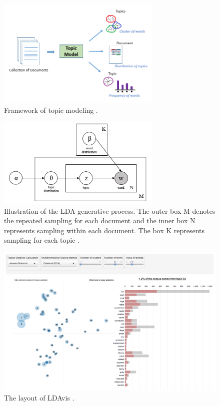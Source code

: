 \documentclass{article}
\begin{document}
\begin{figure}
\centering
\includegraphics[width=0.7\textwidth]{figures/topic_modeling.png}
\caption{\label{fig:topic_modeling}Framework of topic modeling \citep{usmani_natural_2021}.}
\end{figure}

\begin{figure}
\centering
\includegraphics[width=0.7\textwidth]{figures/lda.png}
\caption{\label{fig:lda}Illustration of the LDA generative process. The outer box M denotes the repeated sampling for each document and the inner box N represents sampling within each document. The box K represents sampling for each topic \citep{vayansky_review_2020}.}
\end{figure}

\begin{figure}
\centering
\includegraphics[width=1\textwidth]{figures/ldavis.png}
\caption{\label{fig:ldavis}The layout of LDAvis \citep{sievert_ldavis_2014}.}
\end{figure}
\end{document}
